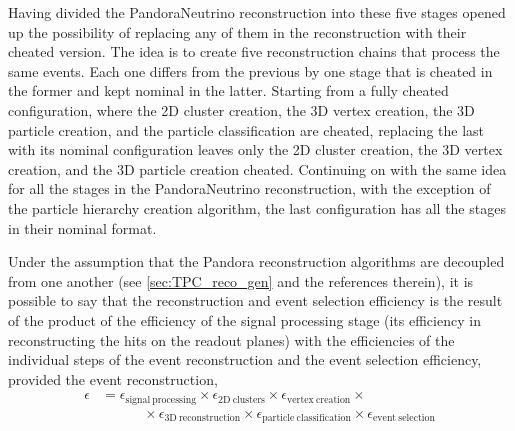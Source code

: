 Having divided the PandoraNeutrino reconstruction into these five stages opened up the possibility of replacing any of them in the reconstruction with their cheated version. The idea is to create five reconstruction chains that process the same events. Each one differs from the previous by one stage that is cheated in the former and kept nominal in the latter. Starting from a fully cheated configuration, where the 2D cluster creation, the 3D vertex creation, the 3D particle creation, and the particle classification are cheated, replacing the last with its nominal configuration leaves only the 2D cluster creation, the 3D vertex creation, and the 3D particle creation cheated. Continuing on with the same idea for all the stages in the PandoraNeutrino reconstruction, with the exception of the particle hierarchy creation algorithm, the last configuration has all the stages in their nominal format. 

Under the assumption that the Pandora reconstruction algorithms are decoupled from one another (see \autoref{sec:TPC_reco_gen} and the references therein), it is possible to say that the reconstruction and event selection efficiency is the result of the product of the efficiency of the signal processing stage (its efficiency in reconstructing the hits on the readout planes) with the efficiencies of the individual steps of the event reconstruction and the event selection efficiency, provided the event reconstruction, \begin{equation}
    \begin{aligned}
        \epsilon &= 
        \epsilon_\mathrm{signal\ processing} \times 
        \epsilon_\mathrm{2D\ clusters} \times 
        \epsilon_\mathrm{vertex\ creation} \times \\
        &\quad\quad\quad\times
        \epsilon_\mathrm{3D\ reconstruction} \times 
        \epsilon_\mathrm{particle\ classification} \times 
        \epsilon_\mathrm{event\ selection}
    \end{aligned}\label{eq:componentsEfficiency}
\end{equation} 

